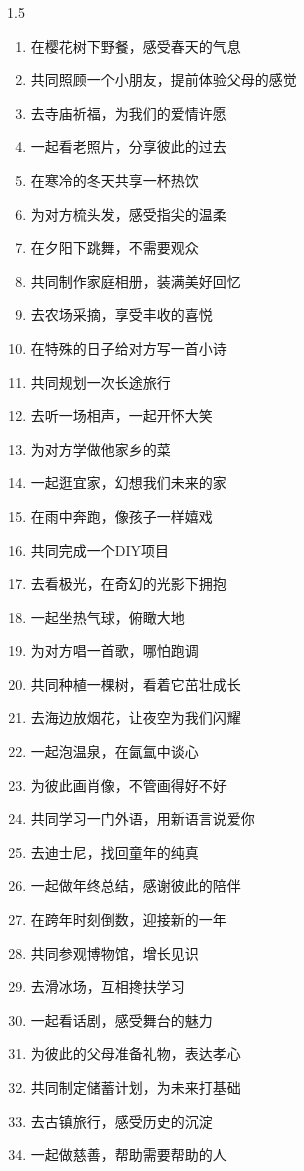 \begin{spacing}{1.5}
\begin{enumerate}
    \item 在樱花树下野餐，感受春天的气息
    \item 共同照顾一个小朋友，提前体验父母的感觉
    \item 去寺庙祈福，为我们的爱情许愿
    \item 一起看老照片，分享彼此的过去
    \item 在寒冷的冬天共享一杯热饮
    \item 为对方梳头发，感受指尖的温柔
    \item 在夕阳下跳舞，不需要观众
    \item 共同制作家庭相册，装满美好回忆
    \item 去农场采摘，享受丰收的喜悦
    \item 在特殊的日子给对方写一首小诗
    \item 共同规划一次长途旅行
    \item 去听一场相声，一起开怀大笑
    \item 为对方学做他家乡的菜
    \item 一起逛宜家，幻想我们未来的家
    \item 在雨中奔跑，像孩子一样嬉戏
    \item 共同完成一个DIY项目
    \item 去看极光，在奇幻的光影下拥抱
    \item 一起坐热气球，俯瞰大地
    \item 为对方唱一首歌，哪怕跑调
    \item 共同种植一棵树，看着它茁壮成长
    \item 去海边放烟花，让夜空为我们闪耀
    \item 一起泡温泉，在氤氲中谈心
    \item 为彼此画肖像，不管画得好不好
    \item 共同学习一门外语，用新语言说爱你
    \item 去迪士尼，找回童年的纯真
    \item 一起做年终总结，感谢彼此的陪伴
    \item 在跨年时刻倒数，迎接新的一年
    \item 共同参观博物馆，增长见识
    \item 去滑冰场，互相搀扶学习
    \item 一起看话剧，感受舞台的魅力
    \item 为彼此的父母准备礼物，表达孝心
    \item 共同制定储蓄计划，为未来打基础
    \item 去古镇旅行，感受历史的沉淀
    \item 一起做慈善，帮助需要帮助的人

\end{enumerate}
\end{spacing}
